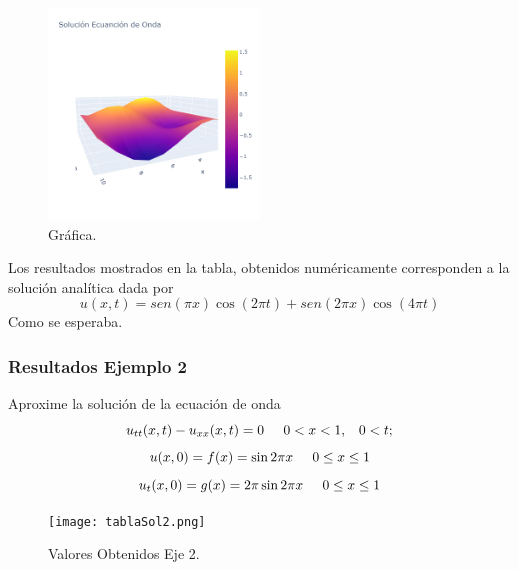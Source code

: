 \documentclass{beamer}
\begin{document}
\begin{frame}
\begin{figure}[h]
\centering
\includegraphics[width=0.5\textwidth]{OndaE1.png}
\caption{\label{fig:Pendulo}Gráfica.}
\end{figure}
Los resultados mostrados en la tabla, obtenidos numéricamente corresponden a la solución analítica dada por
\begin{equation*}
    u(x,t)=sen(\pi x)\cos(2\pi t)+sen(2\pi x)\cos(4\pi t)
\end{equation*}
Como se esperaba.
\end{frame}



\begin{frame}
\frametitle{Resultados Ejemplo 2}
Aproxime la solución de la ecuación de onda
\begin{equation*}
    u_{tt}(x,t)-u_{xx}(x,t)=0 \hspace{0.5cm} 0 < x < 1, \hspace{0.3cm} 0 < t;
\end{equation*}
\begin{equation*}
    u(x,0)=f(x)=\sin{2\pi x} \hspace{0.5cm} 0 \leq x \leq 1
\end{equation*}
\begin{equation*}
     u_t(x,0)=g(x)=2\pi \sin{2\pi x} \hspace{0.5cm} 0 \leq x \leq 1
\end{equation*}

\begin{figure}[h]
\centering
\texttt{[image: tablaSol2.png]}
\caption{\label{fig:Balistico}Valores Obtenidos Eje 2.}
\end{figure}

\end{frame}
\end{document}
